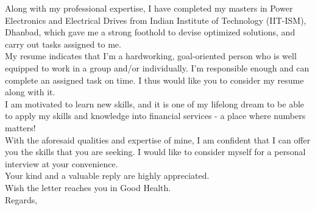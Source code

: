 \documentclass[10pt, a4paper]{article}
\begin{document}
	Along with my professional expertise, I have completed my masters in Power Electronics and Electrical Drives from Indian Institute of Technology (IIT-ISM), Dhanbad, which gave me a strong foothold to devise optimized solutions, and carry out tasks assigned to me. \\[3pt]

	My resume indicates that I’m a hardworking, goal-oriented person who is well equipped to work in a group and/or individually. I’m responsible enough and can complete an assigned task on time. I thus would like you to consider my resume along with it. \\[3pt]

	I am motivated to learn new skills, and it is one of my lifelong dream to be able to apply my skills and knowledge into financial services - a place where numbers matters! \\[3pt]

	With the aforesaid qualities and expertise of mine, I am confident that I can offer you the skills that you are seeking. I would like to consider myself for a personal interview at your convenience. \\[3pt]

	Your kind and a valuable reply are highly appreciated. \\[3pt]

	Wish the letter reaches you in Good Health. \\[5pt]

	Regards, \\ \AuthorFullName
\end{document}
